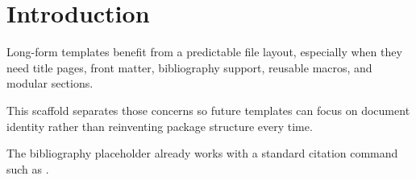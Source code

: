 \chapter{Introduction}

Long-form templates benefit from a predictable file layout, especially when they need title pages, front matter, bibliography support, reusable macros, and modular sections.

This scaffold separates those concerns so future templates can focus on document identity rather than reinventing package structure every time.

The bibliography placeholder already works with a standard citation command such as \citet{doe2025}.
